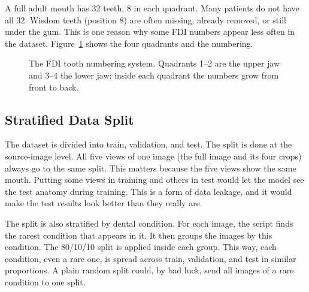 \documentclass[a4paper,12pt]{report}
\begin{document}
A full adult mouth has 32 teeth, 8 in each quadrant. Many patients do not have all 32. Wisdom teeth (position 8) are often missing, already removed, or still under the gum. This is one reason why some FDI numbers appear less often in the dataset. Figure~\ref{fig:fdi} shows the four quadrants and the numbering.

\begin{figure}[H]
    \centering
    \caption{The FDI tooth numbering system. Quadrants 1--2 are the upper jaw and 3--4 the lower jaw; inside each quadrant the numbers grow from front to back.}
    \label{fig:fdi}
\end{figure}

\subsection{Stratified Data Split}

The dataset is divided into train, validation, and test. The split is done at the source-image level. All five views of one image (the full image and its four crops) always go to the same split. This matters because the five views show the same mouth. Putting some views in training and others in test would let the model see the test anatomy during training. This is a form of data leakage, and it would make the test results look better than they really are.

The split is also stratified by dental condition. For each image, the script finds the rarest condition that appears in it. It then groups the images by this condition. The 80/10/10 split is applied inside each group. This way, each condition, even a rare one, is spread across train, validation, and test in similar proportions. A plain random split could, by bad luck, send all images of a rare condition to one split.
\end{document}
